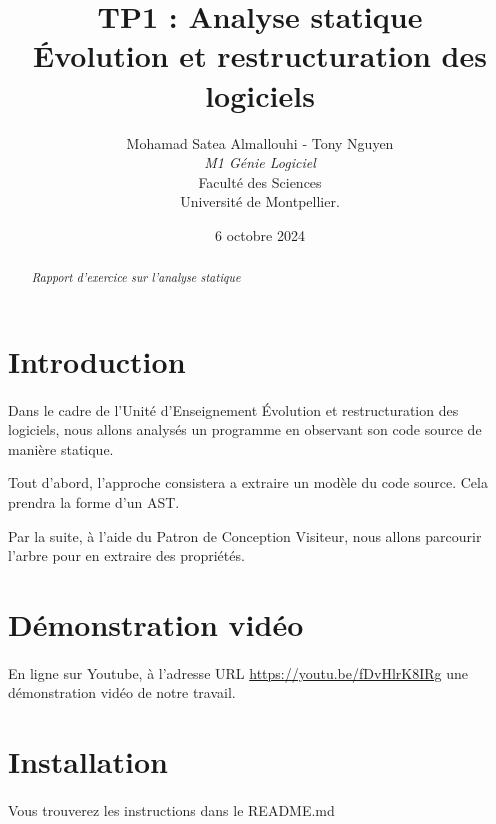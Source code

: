 \documentclass[a4paper]{article}
\title{  TP1 : Analyse statique\\Évolution et restructuration des logiciels}
\author{Mohamad Satea Almallouhi - Tony Nguyen\\\emph{M1 Génie Logiciel}\\Faculté des Sciences\\Université de Montpellier.}
\date{6 octobre 2024}
\begin{document}
    \maketitle
    \begin{center}
    \end{center}

    \begin{abstract}     %
      \emph{Rapport d'exercice sur l'analyse statique}
    \end{abstract}
    \newpage
    \tableofcontents
    \section*{Introduction}
            \paragraph{}
                Dans le cadre de l'Unité d'Enseignement Évolution et restructuration des logiciels, nous allons analysés un programme en observant son code source de manière statique.

                Tout d'abord, l'approche consistera a extraire un modèle du code source. Cela prendra la forme d'un AST.

                Par la suite, à l'aide du Patron de Conception Visiteur, nous allons parcourir l'arbre pour en extraire des propriétés.
        \section*{Démonstration vidéo}
            \paragraph{}
                En ligne sur Youtube, à l'adresse URL \url{https://youtu.be/fDvHlrK8IRg} une démonstration vidéo de notre travail.
        \section*{Installation}
            \paragraph{}
                Vous trouverez les instructions dans le README.md
\end{document}
